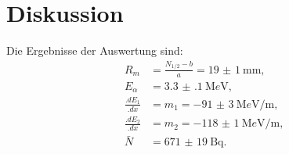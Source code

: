 
\section{Diskussion}
\label{sec:Diskussion}

Die Ergebnisse der Auswertung sind:
\begin{align*}
R_m			&= \frac{N_{1/2}-b}{a} = \SI{19(1)}{\milli\metre}\text{,}\\
E_\alpha 	&= \SI{3.3(1)}{\mega e\volt}\text{,}\\
\frac{.dE_1}{.dx}	&= m_1 = \SI{-91(3)}{\mega e\volt\per\metre}\text{,}\\
\frac{.dE_2}{.dx}	&= m_2 = \SI{-118(1)}{\mega e\volt\per\metre}\text{,}\\
\bar{N}		&= \SI{671(19)}{\becquerel} \text{.}
\end{align*}